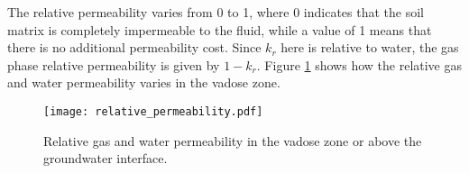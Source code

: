 The relative permeability varies from 0 to 1, where 0 indicates that the soil matrix is completely impermeable to the fluid, while a value of 1 means that there is no additional permeability cost.
Since $k_r$ here is relative to water, the gas phase relative permeability is given by $1 - k_r$.
Figure \ref{fig:relative_permeability} shows how the relative gas and water permeability varies in the vadose zone.\par

\begin{figure}
  \texttt{[image: relative\_permeability.pdf]}
  \caption{Relative gas and water permeability in the vadose zone or above the groundwater interface.}
  \label{fig:relative_permeability}
\end{figure}

\begin{comment}
\begin{equation}\label{eq:van_genuchten_moisture_capacity}
  C_m =
    \begin{cases}
      \frac{\alpha m}{1-m}(\theta_s - \theta_r)\mathrm{Se}^{\frac{1}{m}}\big( 1 - \mathrm{Se}^{\frac{1}{m}} \big)^m & h < 0 \\
    0 & h \geq 0
    \end{cases} \\
\end{equation}
\end{comment}
